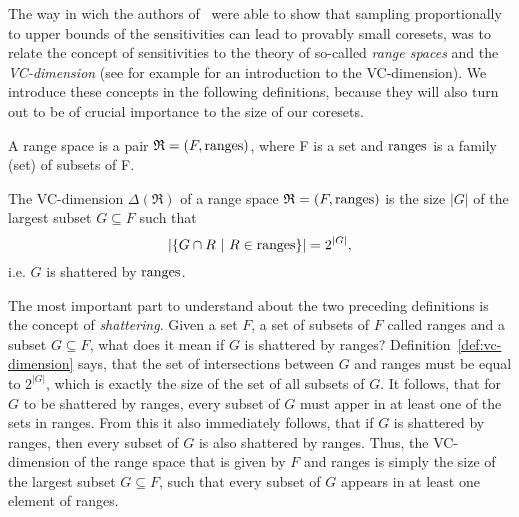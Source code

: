 The way in wich the authors of~\cite{feldman-langberg-coresets}
were able to show that sampling proportionally to upper bounds of the
sensitivities can lead to provably small coresets,
was to relate the concept of sensitivities to
the theory of so-called \textit{range spaces} and
the \textit{VC-dimension}
(see for example \cite{computational-learning-theory} for an
introduction to the VC-dimension).
We introduce these concepts in the following definitions, because
they will also turn out to be of crucial importance to the
size of our coresets.

\begin{definition}
    \label{def:range-space}
    A range space is a pair $\mathfrak{R} = (F, \textup{ranges})$, where F is a set
    and $\textup{ranges}$ is a family (set) of subsets of F.
\end{definition}

\begin{definition}
    \label{def:vc-dimension}
    The VC-dimension $\Delta(\mathfrak{R})$ of a range space
    $\mathfrak{R} = (F, \textup{ranges})$ is
    the size $|G|$ of the largest subset $G \subseteq F$ such that
    \begin{equation*}
        \left| \left\{ G \cap R \ | \ R \in \textup{ranges} \right\} \right|
        = 2^{|G|},
    \end{equation*}
    i.e. $G$ is shattered by $\textup{ranges}$.
\end{definition}

The most important part to understand about the two preceding definitions
is the concept of \textit{shattering}.
Given a set $F$, a set of subsets of $F$ called ranges and a subset
$G \subseteq F$, what does it mean if $G$ is shattered by ranges?
Definition~\ref{def:vc-dimension} says, that the set of intersections
between $G$ and ranges must be equal to $2^{|G|}$, which is exactly
the size of the set of all subsets of $G$.
It follows, that for $G$ to be shattered by ranges, every subset
of $G$ must apper in at least one of the sets in ranges.
From this it also immediately follows, that if $G$ is shattered by
ranges, then every subset of $G$ is also shattered by ranges.
Thus, the VC-dimension of the range space that is given by $F$ and
ranges is simply the size of the largest subset $G \subseteq F$,
such that every subset of
$G$ appears in at least one element of ranges.

